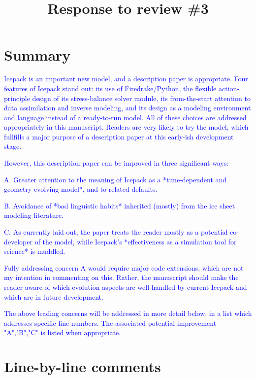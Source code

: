 \documentclass{article}
\theoremstyle{definition}
\theoremstyle{plain}
\begin{document}
\title{Response to review \#3}
\author{}
\date{}

\maketitle

\section*{Summary}

\textcolor{blue}{Icepack is an important new model, and a description paper is appropriate.  Four features of Icepack stand out: its use of Firedrake/Python, the flexible action-principle design of its stress-balance solver module, its from-the-start attention to data assimilation and inverse modeling, and its design as a modeling environment and language instead of a ready-to-run model.  All of these choices are addressed appropriately in this manuscript.  Readers are very likely to try the model, which fullfills a major purpose of a description paper at this early-ish development stage.}

\textcolor{blue}{However, this description paper can be improved in three significant ways:}

\textcolor{blue}{A.  Greater attention to the meaning of Icepack as a *time-dependent and geometry-evolving model*, and to related defaults.}

\textcolor{blue}{B.  Avoidance of *bad linguistic habits* inherited (mostly) from the ice sheet modeling literature.}

\textcolor{blue}{C.  As currently laid out, the paper treats the reader mostly as a potential co-developer of the model, while Icepack's *effectiveness as a simulation tool for science* is muddled.}

\textcolor{blue}{Fully addressing concern A would require major code extensions, which are not my intention in commenting on this.  Rather, the manuscript should make the reader aware of which evolution aspects are well-handled by current Icepack and which are in future development.}

\textcolor{blue}{The above leading concerns will be addressed in more detail below, in a list which addresses specific line numbers.  The associated potential improvement "A","B","C" is listed when appropriate.}



\section*{Line-by-line comments}
\end{document}
